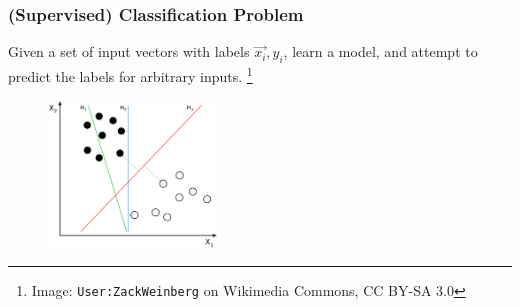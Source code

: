 
\begin{frame}
    \frametitle{(Supervised) Classification Problem}

    Given a set of input vectors with labels \({\vec{x_i}, y_i}\), learn a
    model, and attempt to predict the labels for arbitrary inputs.
    \footnote{Image: \texttt{User:ZackWeinberg} on Wikimedia Commons, CC BY-SA 3.0}

    \begin{figure}
        \includegraphics[width=0.4\textwidth]{figures/sephyper.png}
    \end{figure}

\end{frame}

